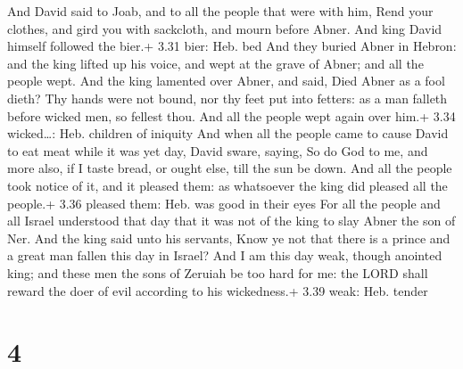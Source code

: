  And David said to Joab, and to all the people that were
with him, Rend your clothes, and gird you with sackcloth, and mourn
before Abner. And king David himself followed the bier.+ 3.31 bier: Heb.
bed  And they buried Abner in Hebron: and the king lifted
up his voice, and wept at the grave of Abner; and all the people wept.
 And the king lamented over Abner, and said, Died Abner as
a fool dieth?  Thy hands were not bound, nor thy feet put
into fetters: as a man falleth before wicked men, so fellest thou. And
all the people wept again over him.+ 3.34 wicked\ldots: Heb. children of
iniquity  And when all the people came to cause David to
eat meat while it was yet day, David sware, saying, So do God to me, and
more also, if I taste bread, or ought else, till the sun be down.
 And all the people took notice of it, and it pleased them:
as whatsoever the king did pleased all the people.+ 3.36 pleased them:
Heb. was good in their eyes  For all the people and all
Israel understood that day that it was not of the king to slay Abner the
son of Ner.  And the king said unto his servants, Know ye
not that there is a prince and a great man fallen this day in Israel?
 And I am this day weak, though anointed king; and these
men the sons of Zeruiah be too hard for me: the LORD shall reward the
doer of evil according to his wickedness.+ 3.39 weak: Heb. tender

\hypertarget{section-3}{%
\section{4}\label{section-3}}

